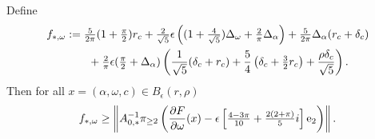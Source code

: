 \begin{proposition}
			\label{prop:Zsw}
Define 
		\begin{alignat}{1}
		f_{*,\omega} &:=
		\tfrac{5}{2 \pi}  (1+ \tfrac{\pi}{2})  r_c 
		+
		\tfrac{2}{\sqrt{5}}  \epsilon \left( (1+\tfrac{4}{\sqrt{5}}) \Delta_\omega + \tfrac{2}{\pi}\Delta_\alpha \right) \nonumber
		+
		\tfrac{5}{2\pi} \Delta_\alpha ( r_c + \delta_c) 
		\\& \qquad + 
		  \tfrac{2}{ \pi} \epsilon(\tfrac{\pi}{2} + 	 \Delta_\alpha ) \left( \frac{1}{\sqrt{5}} ( \delta_c + r_c) + \frac{5}{4} \left(  \delta_c  + \tfrac{3}{2}r_c \right)  +  \frac{ \rho \delta_c   }{\sqrt{5}}\right) . \label{e:fstaromega}
		\end{alignat}
%
	Then for all $x= (\alpha,\omega,c) \in B_\epsilon(r,\rho)$
	\[
	f_{*,\omega} \geq  
	 \left\| A_{0,*}^{-1}  \pi_{\geq 2}\left( \frac{\partial F}{\partial \omega}(x) -  \epsilon \left[ \tfrac{4-3\pi}{10} + \tfrac{2(2 + \pi)}{5}i \right] \mathrm{e}_2  \right) \right\| .  
	\]
\end{proposition}

